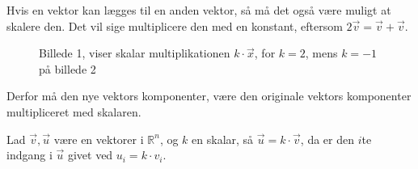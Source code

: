 Hvis en vektor kan lægges til en anden vektor, så må det også være muligt at skalere den. Det vil sige multiplicere den med en konstant, eftersom $2\vec{v}=\vec{v}+\vec{v}$.\\ %
\begin{figure}[h]
\begin{center}

\caption{Billede 1, viser skalar multiplikationen $k \cdot \vec{x}$, for $k=2$, mens $k=-1$ på billede 2}
\end{center}
\label{fig:vektorskalar}
\end{figure}
Derfor må den nye vektors komponenter, være den originale vektors komponenter multipliceret med skalaren.
\begin{defn}
Lad $\vec{v}, \vec{u}$ være en vektorer i $\mathds{R}^n$, og $k$ en skalar, så $\vec{u} = k \cdot \vec{v}$, da er den $i$te indgang i $\vec{u}$ givet ved $u_i = k\cdot v_i$.
\end{defn}
